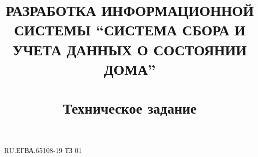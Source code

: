 \documentclass[a4paper,12pt]{article}
\begin{document}
\sloppy
\title{РАЗРАБОТКА ИНФОРМАЦИОННОЙ СИСТЕМЫ “СИСТЕМА СБОРА И УЧЕТА ДАННЫХ О СОСТОЯНИИ ДОМА”\\
~\\
Техническое задание}

\begin{uspd}{RU.ЕГВА.65108-19 ТЗ 01}



\end{uspd}
\end{document}
